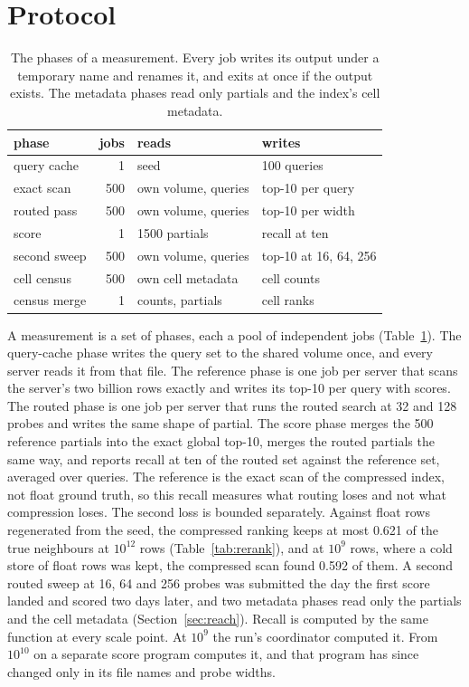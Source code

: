 \documentclass[sigconf, nonacm]{acmart}
\begin{document}
\section{Protocol}
\label{sec:protocol}

\begin{table}[t]
\caption{The phases of a measurement. Every job writes its output under a temporary name and
renames it, and exits at once if the output exists. The metadata phases read only partials and the
index's cell metadata.}
\label{tab:phases}
\centering
\small
\setlength{\tabcolsep}{3pt}
\begin{tabular}{lrll}
\toprule
phase & jobs & reads & writes \\
\midrule
query cache    & 1   & seed & 100 queries \\
exact scan     & 500 & own volume, queries & top-10 per query \\
routed pass    & 500 & own volume, queries & top-10 per width \\
score          & 1   & 1500 partials & recall at ten \\
second sweep   & 500 & own volume, queries & top-10 at 16, 64, 256 \\
cell census    & 500 & own cell metadata & cell counts \\
census merge   & 1   & counts, partials & cell ranks \\
\bottomrule
\end{tabular}
\end{table}

A measurement is a set of phases, each a pool of independent jobs (Table~\ref{tab:phases}). The
query-cache phase writes the query set to the shared volume once, and every server reads it from
that file. The reference phase is one job per server that scans the server's two billion rows
exactly and writes its top-10 per query with scores. The routed phase is one job per server that
runs the routed search at 32 and 128 probes and writes the same shape of partial. The score phase
merges the 500 reference partials into the exact global top-10, merges the routed partials the
same way, and reports recall at ten of the routed set against the reference set, averaged over
queries. The reference is the exact scan of the compressed index, not float ground truth, so this
recall measures what routing loses and not what compression loses. The second loss is bounded
separately. Against float rows regenerated from the seed, the compressed ranking keeps at most
0.621 of the true neighbours at $10^{12}$ rows (Table~\ref{tab:rerank}), and at $10^{9}$ rows,
where a cold store of float rows was kept, the compressed scan found 0.592 of them. A second routed sweep at 16, 64 and 256 probes was submitted the day the first score
landed and scored two days later, and two metadata phases read only the partials and the cell
metadata (Section~\ref{sec:reach}). Recall is computed by the same function at every scale
point. At $10^{9}$ the run's coordinator computed it. From $10^{10}$ on a separate score program
computes it, and that program has since changed only in its file names and probe widths.
\end{document}

